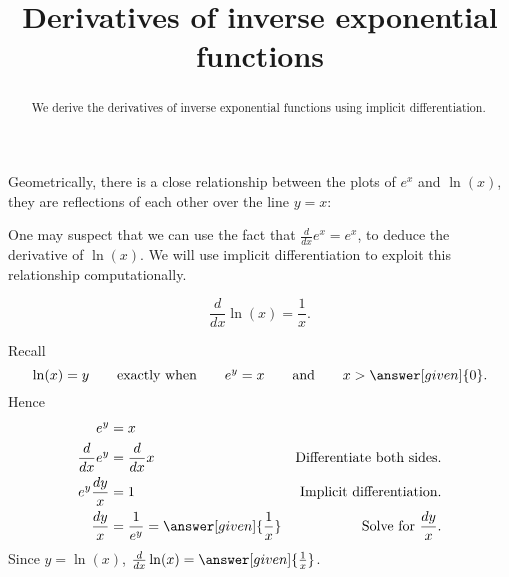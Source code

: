 \documentclass{ximera}
\title[Dig-In:]{Derivatives of inverse exponential functions}
\begin{document}
\begin{abstract}
  We derive the derivatives of inverse exponential functions using
  implicit differentiation.
\end{abstract}
\maketitle


Geometrically, there is a close relationship between the plots of
$e^x$ and $\ln(x)$, they are reflections of each other over the line
$y=x$:
\begin{image}
\end{image}
One may suspect that we can use the fact that $\frac{d}{dx} e^x = e^x$, to
deduce the derivative of $\ln(x)$.  We will use implicit
differentiation to exploit this relationship computationally.

\begin{theorem}
\[
\frac{d}{dx} \ln(x) = \frac{1}{x}.
\]
\begin{explanation}
  Recall
\[
\ln(x) = y \qquad\text{exactly when}\qquad e^y = x\qquad\text{and}\qquad x>\answer[given]{0}.
\]
Hence
\begin{align*}
e^y &= x\\
\frac{d}{dx} e^y &= \frac{d}{dx} x &\text{Differentiate both sides.}\\
e^y \frac{dy}{x} &= 1 &\text{Implicit differentiation.}\\
\frac{dy}{x} &= \frac{1}{e^y} = \answer[given]{\frac{1}{x}}&\text{Solve for $\frac{dy}{x}$.}
\end{align*}
Since $y=\ln(x)$, $\frac{d}{dx} \ln(x) = \answer[given]{\frac{1}{x}}$.
\end{explanation}
\end{theorem}
\end{document}
